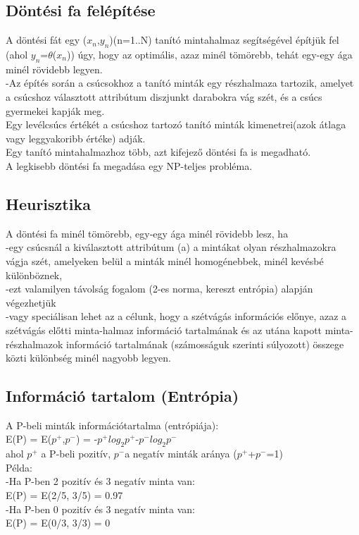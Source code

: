 \documentclass{article}
\begin{document}
	 \subsection{Döntési fa felépítése}
	 A döntési fát egy ($x_n$,$y_n$)(n=1..N) tanító mintahalmaz segítségével építjük fel (ahol $y_n$=$\theta$($x_n$)) úgy, hogy az optimális, azaz minél tömörebb, tehát egy-egy ága minél rövidebb legyen.\\
	 -Az építés során a csúcsokhoz a tanító minták egy részhalmaza tartozik, amelyet a csúcshoz választott attribútum diszjunkt darabokra vág szét, és a csúcs gyermekei kapják meg.\\
	 Egy levélcsúcs értékét a csúcshoz tartozó tanító minták kimenetrei(azok átlaga vagy leggyakoribb értéke) adják.\\
	 Egy tanító mintahalmazhoz több, azt kifejező döntési fa is megadható.\\
	 A legkisebb döntési fa megadása egy NP-teljes probléma.
	 
	 \subsection{Heurisztika}
	 A döntési fa minél tömörebb, egy-egy ága minél rövidebb lesz, ha\\
	 -egy csúcsnál a kiválasztott attribútum (a) a mintákat olyan részhalmazokra vágja szét, amelyeken belül a minták minél homogénebbek, minél kevésbé különböznek,\\
	 -ezt valamilyen távolság fogalom (2-es norma, kereszt entrópia) alapján végezhetjük\\
	 -vagy speciálisan lehet az a célunk, hogy a szétvágás információs előnye, azaz a szétvágás előtti minta-halmaz információ tartalmának és az utána kapott minta-részhalmazok információ tartalmának (számosságuk szerinti súlyozott) összege közti különbség minél nagyobb legyen.\\
	 
	 \subsection{Információ tartalom (Entrópia)}
	 A P-beli minták információtartalma (entrópiája):\\
	 E(P) = E($p^+$,$p^-$) = -$p^+$$log_2$$p^+$-$p^-$$log_2$$p^-$\\
	 ahol $p^+$ a P-beli pozitív, $p^-$a negatív minták aránya ($p^+$+$p^-$=1)\\
	 Példa:\\
	 -Ha P-ben 2 pozitív és 3 negatív minta van:\\
	 E(P) = E(2/5, 3/5) = 0.97\\
	 -Ha P-ben 0 pozitív és 3 negatív minta van:\\
	 E(P) = E(0/3, 3/3) = 0\\
	 
\end{document}

